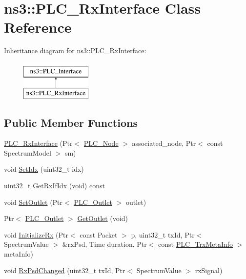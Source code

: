 \hypertarget{classns3_1_1PLC__RxInterface}{\section{ns3\-:\-:\-P\-L\-C\-\_\-\-Rx\-Interface \-Class \-Reference}
\label{classns3_1_1PLC__RxInterface}
}
\-Inheritance diagram for ns3\-:\-:\-P\-L\-C\-\_\-\-Rx\-Interface\-:\begin{figure}[H]
\begin{center}
\leavevmode
\includegraphics[height=2.000000cm]{classns3_1_1PLC__RxInterface}
\end{center}
\end{figure}
\subsection*{\-Public \-Member \-Functions}
\begin{DoxyCompactItemize}
\item 
\hyperlink{classns3_1_1PLC__RxInterface_aaa0968f79a07db808c0122c28ec25204}{\-P\-L\-C\-\_\-\-Rx\-Interface} (\-Ptr$<$ \hyperlink{classns3_1_1PLC__Node}{\-P\-L\-C\-\_\-\-Node} $>$ associated\-\_\-node, \-Ptr$<$ const \-Spectrum\-Model $>$ sm)
\item 
void \hyperlink{classns3_1_1PLC__RxInterface_a2760adb4b1bda24377254c7fec9cd21d}{\-Set\-Idx} (uint32\-\_\-t idx)
\item 
uint32\-\_\-t \hyperlink{classns3_1_1PLC__RxInterface_aa0c5595df05fa4bdfe66e7ddb24059fc}{\-Get\-Rx\-If\-Idx} (void) const 
\item 
void \hyperlink{classns3_1_1PLC__RxInterface_ad7659f89d745e25b469beb2dfcc475d1}{\-Set\-Outlet} (\-Ptr$<$ \hyperlink{classns3_1_1PLC__Outlet}{\-P\-L\-C\-\_\-\-Outlet} $>$ outlet)
\item 
\-Ptr$<$ \hyperlink{classns3_1_1PLC__Outlet}{\-P\-L\-C\-\_\-\-Outlet} $>$ \hyperlink{classns3_1_1PLC__RxInterface_a51921ebe8b6889afe7df65329a272d47}{\-Get\-Outlet} (void)
\item 
void \hyperlink{classns3_1_1PLC__RxInterface_a8dfc9936531323a25d3625d0e9a2a707}{\-Initialize\-Rx} (\-Ptr$<$ const \-Packet $>$ p, uint32\-\_\-t tx\-Id, \-Ptr$<$ \-Spectrum\-Value $>$ \&rx\-Psd, \-Time duration, \-Ptr$<$ const \hyperlink{classns3_1_1PLC__TrxMetaInfo}{\-P\-L\-C\-\_\-\-Trx\-Meta\-Info} $>$ meta\-Info)
\item 
void \hyperlink{classns3_1_1PLC__RxInterface_a5ed074ad9563a148975b3b5b3e15eb40}{\-Rx\-Psd\-Changed} (uint32\-\_\-t tx\-Id, \-Ptr$<$ \-Spectrum\-Value $>$ rx\-Signal)
\end{DoxyCompactItemize}
